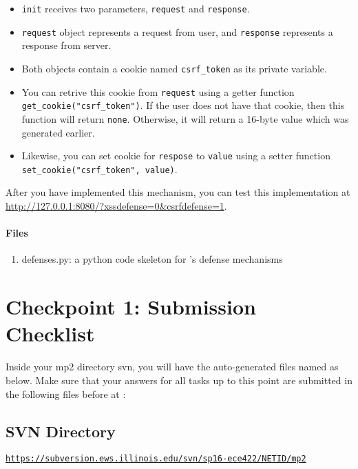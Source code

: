 \documentclass[letterpaper,12pt]{report}
\begin{document}
\begin{itemize}
\item \texttt{init} receives two parameters, \texttt{request} and \texttt{response}.
\item \texttt{request} object represents a request from user, and \texttt{response} represents a response from server.
\item Both objects contain a cookie named \texttt{csrf\_token} as its private variable.
\item You can retrive this cookie from \texttt{request} using a getter function \texttt{get\_cookie("csrf\_token")}. If the user does not have that cookie, then this function will return \texttt{none}. Otherwise, it will return a 16-byte value which was generated earlier.
\item Likewise, you can set cookie for \texttt{respose} to \texttt{value} using a setter function \texttt{set\_cookie("csrf\_token", value)}.
\end{itemize}

After you have implemented this mechanism, you can test this implementation at \url{http://127.0.0.1:8080/?xssdefense=0&csrfdefense=1}.\\

\paragraph{Files}
\begin{enumerate}
\item defenses.py: a python code skeleton for \bungle's defense mechanisms\\
\end{enumerate}


\newpage

\section*{Checkpoint 1: Submission Checklist}
 
Inside your mp2 directory svn, you will have the auto-generated files named as below.  Make sure that your answers for all tasks up to this point are submitted in the following files before \textbf{\checkpointduedate} at \textbf{\duetime}:

\subsection*{SVN Directory}
\href{https://subversion.ews.illinois.edu/svn/fa15-cs461/NETID/mp2}{\texttt{https://subversion.ews.illinois.edu/svn/sp16-ece422/NETID/mp2}}
\end{document}
